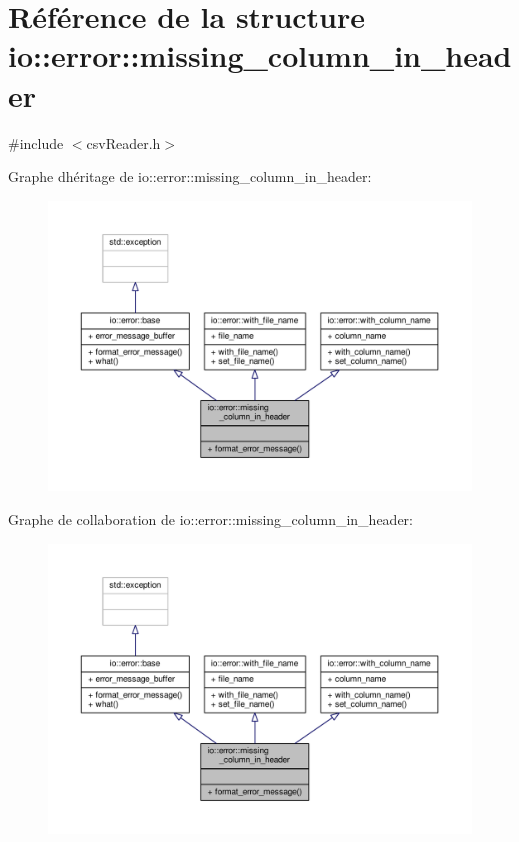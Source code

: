 \hypertarget{structio_1_1error_1_1missing__column__in__header}{}\section{Référence de la structure io\+:\+:error\+:\+:missing\+\_\+column\+\_\+in\+\_\+header}
\label{structio_1_1error_1_1missing__column__in__header}


{\ttfamily \#include $<$csv\+Reader.\+h$>$}



Graphe d\textquotesingle{}héritage de io\+:\+:error\+:\+:missing\+\_\+column\+\_\+in\+\_\+header\+:\nopagebreak
\begin{figure}[H]
\begin{center}
\leavevmode
\includegraphics[width=350pt]{structio_1_1error_1_1missing__column__in__header__inherit__graph}
\end{center}
\end{figure}


Graphe de collaboration de io\+:\+:error\+:\+:missing\+\_\+column\+\_\+in\+\_\+header\+:\nopagebreak
\begin{figure}[H]
\begin{center}
\leavevmode
\includegraphics[width=350pt]{structio_1_1error_1_1missing__column__in__header__coll__graph}
\end{center}
\end{figure}
